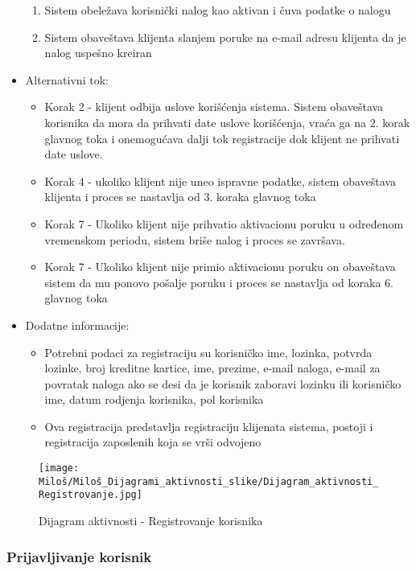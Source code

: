 \documentclass[a4paper]{article}
\begin{document}
\begin{itemize}
\begin{enumerate}
            \item Sistem obeležava korisnički nalog kao aktivan i čuva podatke o nalogu
            \item Sistem obaveštava klijenta slanjem poruke na e-mail adresu klijenta da je nalog uspešno kreiran 
        \end{enumerate}
    \item Alternativni tok:
        \begin{itemize}
            \item Korak 2 - klijent odbija uslove korišćenja sistema. Sistem obaveštava korisnika da mora da prihvati date uslove korišćenja, vraća ga na 2. korak glavnog toka i onemogućava dalji tok registracije dok klijent ne prihvati date uslove.
            \item Korak 4 - ukoliko klijent nije uneo ispravne podatke, sistem obaveštava klijenta i proces se nastavlja od 3. koraka glavnog toka
            \item Korak 7 - Ukoliko klijent nije prihvatio aktivacionu poruku u određenom vremenskom periodu, sistem briše nalog i proces se završava.
            \item Korak 7 - Ukoliko klijent nije primio aktivacionu poruku on obaveštava sistem da mu ponovo pošalje poruku i proces se nastavlja od koraka 6. glavnog toka
        \end{itemize}
    \item Dodatne informacije:
        \begin{itemize}
            \item Potrebni podaci za registraciju su korisničko ime, lozinka, potvrda lozinke, broj kreditne kartice, ime, prezime, e-mail naloga, e-mail za povratak naloga ako se desi da je korisnik zaboravi lozinku ili korisničko ime, datum rodjenja korisnika, pol korisnika
            \item Ova registracija predstavlja registraciju klijenata sistema, postoji i registracija zaposlenih koja se vrši odvojeno
        \end{itemize}
\end{itemize}

\begin{figure}[htp]
    \centering
    \texttt{[image: Miloš/Miloš\_Dijagrami\_aktivnosti\_slike/Dijagram\_aktivnosti\_Registrovanje.jpg]}
    \caption{Dijagram aktivnosti - Registrovanje korisnika}
    \label{fig:Registracija aktivnost}
\end{figure}


\subsubsection{Prijavljivanje korisnik}
\end{document}
